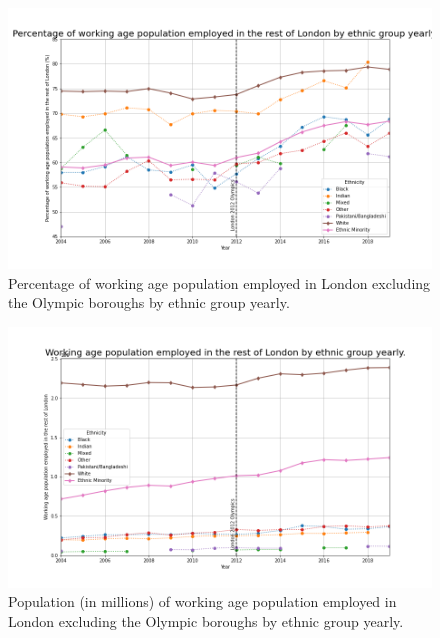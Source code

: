 \documentclass[12pt,twoside]{article}
\begin{document}
\begin{figure}[!htb]
\centering
\includegraphics[width=0.9\linewidth]{figures/percentages-the rest of London.png}
\caption{Percentage of working age population employed in London excluding the Olympic boroughs by ethnic group yearly.}
\label{fig:perc-rest-of-london}
\end{figure}
\begin{figure}[!htb]
\centering
\includegraphics[width=0.9\linewidth]{figures/population-the rest of London.png}
\caption{Population (in millions) of working age population employed in London excluding the Olympic boroughs by ethnic group yearly.}
\label{fig:pop-rest-of-london}
\end{figure}
\end{document}
